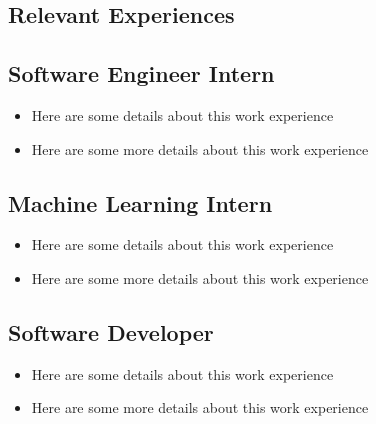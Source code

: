 \documentclass{mxresume}
\begin{document}
\begin{minipage}[t]{0.73\textwidth} %
\begin{resumebody}
\section*{Relevant Experiences} 
\subsection*{Software Engineer Intern}
\begin{itemize}[leftmargin=4.5mm] %
\setlength{\itemsep}{0mm}
\item Here are some details about this work experience
\item Here are some more details about this work experience
\end{itemize}
\subsection*{Machine Learning Intern}
\begin{itemize}[leftmargin=4.5mm] %
\setlength{\itemsep}{0mm}
\item Here are some details about this work experience
\item Here are some more details about this work experience
\end{itemize}
\subsection*{Software Developer}
\begin{itemize}[leftmargin=4.5mm]
\setlength{\itemsep}{0mm}
\item Here are some details about this work experience
\item Here are some more details about this work experience
\end{itemize}

\end{resumebody}
\end{minipage}
\end{document}

